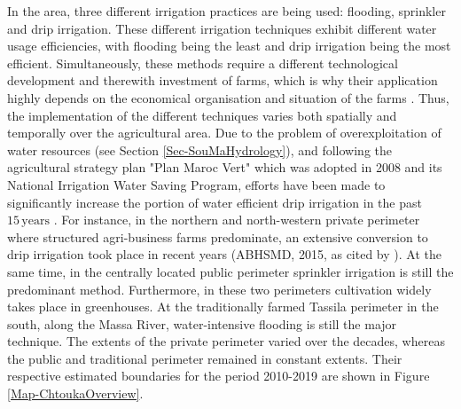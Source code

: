 In the area, three different irrigation practices are being used: flooding, sprinkler and drip irrigation. 
These different irrigation techniques exhibit different water usage efficiencies, with flooding being the least and drip irrigation being the most efficient. 
Simultaneously, these methods require a different technological development and therewith investment of farms, which is why their application highly depends on the economical organisation and situation of the farms \parencite{Choukr.2017}. 
Thus, the implementation of the different techniques varies both spatially and temporally over the agricultural area. 
Due to the problem of overexploitation of water resources (see Section \ref{Sec-SouMaHydrology}), and following the agricultural strategy plan "Plan Maroc Vert" which was adopted in 2008 and its National Irrigation Water Saving Program, efforts have been made to significantly increase the portion of water efficient drip irrigation in the past $15 \, \textrm{years}$ \parencite{MarocVert.2021}. 
For instance, in the northern and north-western private perimeter where structured agri-business farms predominate, an extensive conversion to drip irrigation took place in recent years (ABHSMD, 2015, as cited by \cite{Choukr.2017}). 
At the same time, in the centrally located public perimeter sprinkler irrigation is still the predominant method. 
Furthermore, in these two perimeters cultivation widely takes place in greenhouses. 
At the traditionally farmed Tassila perimeter in the south, along the Massa River, water-intensive flooding is still the major technique. 
The extents of the private perimeter varied over the decades, whereas the public and traditional perimeter remained in constant extents. 
Their respective estimated boundaries for the period 2010-2019 are shown in Figure \ref{Map-ChtoukaOverview}.